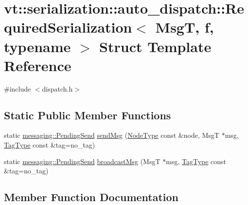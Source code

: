 \hypertarget{structvt_1_1serialization_1_1auto__dispatch_1_1_required_serialization}{}\section{vt\+:\+:serialization\+:\+:auto\+\_\+dispatch\+:\+:Required\+Serialization$<$ MsgT, f, typename $>$ Struct Template Reference}
\label{structvt_1_1serialization_1_1auto__dispatch_1_1_required_serialization}


{\ttfamily \#include $<$dispatch.\+h$>$}

\subsection*{Static Public Member Functions}
\begin{DoxyCompactItemize}
\item 
static \hyperlink{structvt_1_1messaging_1_1_pending_send}{messaging\+::\+Pending\+Send} \hyperlink{structvt_1_1serialization_1_1auto__dispatch_1_1_required_serialization_a739f57acd49730073734dac89231d8bb}{send\+Msg} (\hyperlink{namespacevt_a866da9d0efc19c0a1ce79e9e492f47e2}{Node\+Type} const \&node, MsgT $\ast$msg, \hyperlink{namespacevt_a84ab281dae04a52a4b243d6bf62d0e52}{Tag\+Type} const \&tag=no\+\_\+tag)
\item 
static \hyperlink{structvt_1_1messaging_1_1_pending_send}{messaging\+::\+Pending\+Send} \hyperlink{structvt_1_1serialization_1_1auto__dispatch_1_1_required_serialization_aed6fdc75ec4eb6c021b2355c8e813014}{broadcast\+Msg} (MsgT $\ast$msg, \hyperlink{namespacevt_a84ab281dae04a52a4b243d6bf62d0e52}{Tag\+Type} const \&tag=no\+\_\+tag)
\end{DoxyCompactItemize}


\subsection{Member Function Documentation}
\mbox{\label{structvt_1_1serialization_1_1auto__dispatch_1_1_required_serialization_aed6fdc75ec4eb6c021b2355c8e813014}} 
